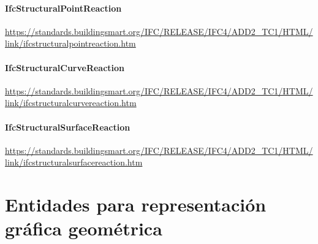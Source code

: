 \documentclass[spanish,12pt,a4paper,final,oneside]{book}
\begin{document}
\subsubsection{IfcStructuralPointReaction}
\url{https://standards.buildingsmart.org/IFC/RELEASE/IFC4/ADD2_TC1/HTML/link/ifcstructuralpointreaction.htm}

\subsubsection{IfcStructuralCurveReaction}
\url{https://standards.buildingsmart.org/IFC/RELEASE/IFC4/ADD2_TC1/HTML/link/ifcstructuralcurvereaction.htm}

\subsubsection{IfcStructuralSurfaceReaction}
\url{https://standards.buildingsmart.org/IFC/RELEASE/IFC4/ADD2_TC1/HTML/link/ifcstructuralsurfacereaction.htm}






\chapter{Entidades para representación gráfica geométrica} \label{entidades_geometria}
\end{document}

